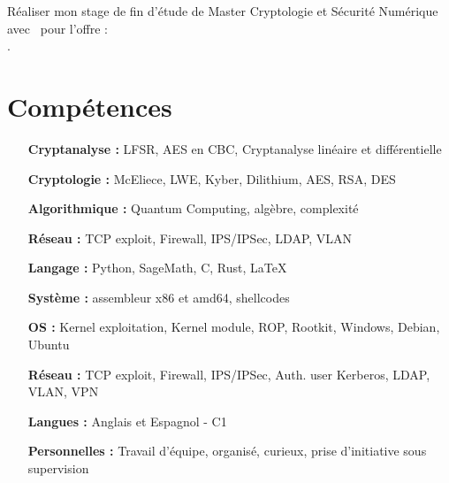 \documentclass[letterpaper,10pt]{article}
\begin{document}




   Réaliser mon stage de fin d'étude de Master Cryptologie et Sécurité Numérique avec \entreprise\ pour l'offre :\\ \hspace{61pt}{ \large \stagename}.


  \section{Compétences}

  \begin{multicols}{2}
    \begin{itemize}[itemsep=-2px, parsep=1pt, leftmargin=75pt]
      \item[\textbf{Cryptanalyse :}] LFSR, AES en CBC, Cryptanalyse linéaire et différentielle
      \item[\textbf{Cryptologie :}] McEliece, LWE, Kyber, Dilithium, AES, RSA, DES
      \item[\textbf{Algorithmique :}] Quantum Computing, algèbre, complexité
      
      \item[\textbf{Réseau :}] TCP exploit, Firewall, IPS/IPSec, LDAP, VLAN
      \item[\textbf{Langage :}] Python, SageMath, C, Rust, LaTeX
      \item[\textbf{Système :}] assembleur x86 et amd64, shellcodes 
      \item[\textbf{OS :}] Kernel exploitation, Kernel module, ROP, Rootkit, Windows, Debian, Ubuntu
     \item[\textbf{Réseau :}] TCP exploit, Firewall, IPS/IPSec, Auth. user Kerberos, LDAP, VLAN, VPN
      \item[\textbf{Langues :}] Anglais et Espagnol - C1
      \item[\textbf{Personnelles :}] Travail d'équipe, organisé, curieux, prise d'initiative sous supervision
    \end{itemize}
  \end{multicols}
\end{document}
